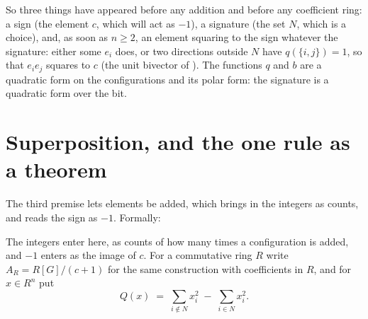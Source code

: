 \documentclass[11pt]{article}
\theoremstyle{definition}
\theoremstyle{plain}
\begin{document}
So three things have appeared before any addition and before any coefficient ring: a sign (the element $c$, which will act as $-1$), a signature (the set $N$, which is a choice), and, as soon as $n \geq 2$, an element squaring to the sign whatever the signature: either some $e_{i}$ does, or two directions outside $N$ have $q(\{i,j\}) = 1$, so that $e_{i}e_{j}$ squares to $c$ (the unit bivector of \cite[Example 2.1]{ButlerT0}). The functions $q$ and $b$ are a quadratic form on the configurations and its polar form: the signature is a quadratic form over the bit.

\section{Superposition, and the one rule as a theorem}

\label{c:note.geometry-first.setting-superposition-one-rule-theorem}
The third premise lets elements be added, which brings in the integers as counts, and reads the sign as $-1$. Formally:

\label{c:note.geometry-first.setting-superposition-one-rule-theorem-2}
The integers enter here, as counts of how many times a configuration is added, and $-1$ enters as the image of $c$. For a commutative ring $R$ write $A_{R} = R[G]/(c+1)$ for the same construction with coefficients in $R$, and for $x \in R^{n}$ put
\[
Q(x) \;=\; \sum_{i \notin N} x_{i}^{2} \;-\; \sum_{i \in N} x_{i}^{2} .
\]
\end{document}
